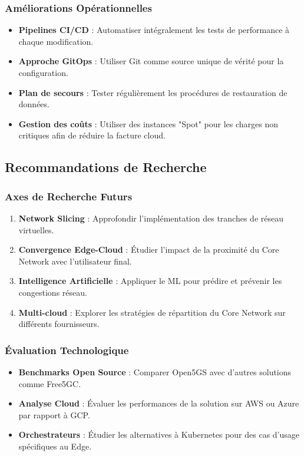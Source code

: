 \documentclass[12pt,a4paper]{report}
\begin{document}
\subsubsection{Améliorations Opérationnelles}

\begin{itemize}
    \item \textbf{Pipelines CI/CD} : Automatiser intégralement les tests de performance à chaque modification.
    \item \textbf{Approche GitOps} : Utiliser Git comme source unique de vérité pour la configuration.
    \item \textbf{Plan de secours} : Tester régulièrement les procédures de restauration de données.
    \item \textbf{Gestion des coûts} : Utiliser des instances "Spot" pour les charges non critiques afin de réduire la facture cloud.
\end{itemize}

\subsection{Recommandations de Recherche}

\subsubsection{Axes de Recherche Futurs}

\begin{enumerate}
    \item \textbf{Network Slicing} : Approfondir l'implémentation des tranches de réseau virtuelles.
    \item \textbf{Convergence Edge-Cloud} : Étudier l'impact de la proximité du Core Network avec l'utilisateur final.
    \item \textbf{Intelligence Artificielle} : Appliquer le ML pour prédire et prévenir les congestions réseau.
    \item \textbf{Multi-cloud} : Explorer les stratégies de répartition du Core Network sur différents fournisseurs.
\end{enumerate}

\subsubsection{Évaluation Technologique}

\begin{itemize}
    \item \textbf{Benchmarks Open Source} : Comparer Open5GS avec d'autres solutions comme Free5GC.
    \item \textbf{Analyse Cloud} : Évaluer les performances de la solution sur AWS ou Azure par rapport à GCP.
    \item \textbf{Orchestrateurs} : Étudier les alternatives à Kubernetes pour des cas d'usage spécifiques au Edge.
\end{itemize}
\end{document}
